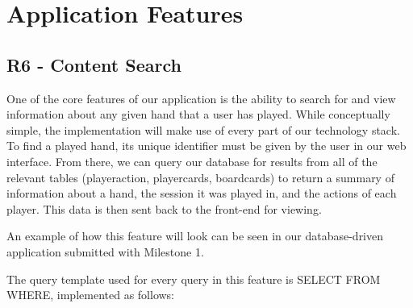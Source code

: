 \documentclass{article}
\begin{document}
\section*{Application Features}
    \subsection*{R6 - Content Search}

        One of the core features of our application is the ability to search for and view information about any given hand that a user has played. While conceptually simple, the implementation 
        will make use of every part of our technology stack. To find a played hand, its unique identifier must be given by the user in our web interface. 
        From there, we can query our database for results from all of the relevant tables (player\textunderscore action, player\textunderscore cards, board\textunderscore cards) 
        to return a summary of information about a hand, the session it was played in, and the actions of each player. This data is then sent back to the front-end for viewing. 

        An example of how this feature will look can be seen in our database-driven application submitted with Milestone 1.

        The query template used for every query in this feature is SELECT FROM WHERE, implemented as follows:
\end{document}
